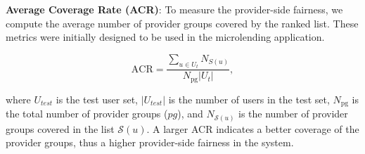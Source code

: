   
        \textbf{Average Coverage Rate (ACR)}: To measure the provider-side fairness, we compute the average number of provider groups covered by the ranked list. These metrics were initially designed to be used in the microlending application.
        
        \begin{equation}
            \text{ACR}=\frac{\sum_{u\in U_t}N_{S(u)}}{N_\text{pg}|U_t|},
        \end{equation}
        
        where $U_{test}$ is the test user set, $|U_{test}|$ is the number of users in the test set, $N_\text{pg}$ is the total number of provider groups ($pg$), and $N_{\mathcal{S}(u)}$ is the number of provider groups covered in the list $\mathcal{S}(u)$. A larger ACR indicates a better coverage of the provider groups, thus a higher provider-side fairness in the system.
        
        
        
        
        
        
        
